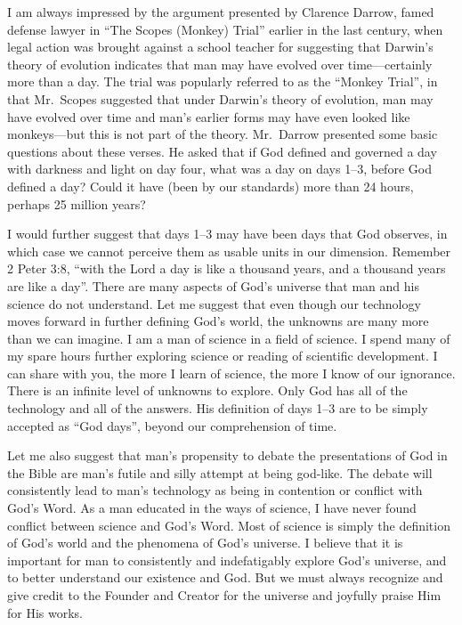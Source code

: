 \documentclass[12pt]{memoir}
\begin{document}
I am always impressed by the argument presented by Clarence Darrow,
famed defense lawyer in ``The Scopes (Monkey) Trial'' earlier in
the last century, when legal action was brought against a school teacher
for suggesting that Darwin's theory of evolution indicates that man
may have evolved over time---certainly more than a day. The trial
was popularly referred to as the ``Monkey Trial'', in that Mr.\ Scopes
suggested that under Darwin's theory of evolution, man may have evolved
over time and man's earlier forms may have even looked like monkeys---but
this is not part of the theory. Mr.\ Darrow presented some basic questions
about these verses. He asked that if God defined and governed a day with darkness and light on day four, what was a day on days 1--3, before God defined a day? Could it have (been by our standards) more
than 24 hours, perhaps 25 million years?

I would further suggest that days 1--3 may have been days that God observes, in which case we cannot perceive them as usable units in our dimension. Remember 2 Peter 3:8, ``with the Lord a day is like a thousand years, and a thousand years are like a day''. There are
many aspects of God's universe that man and his science do not understand.
Let me suggest that even though our technology moves forward in further
defining God's world, the unknowns are many more than we can imagine.
I am a man of science in a field of science. I spend many of my spare
hours further exploring science or reading of scientific development.
I can share with you, the more I learn of science, the more I know
of our ignorance. There is an infinite level of unknowns to explore.
Only God has all of the technology and all of the answers. His definition
of days 1--3 are to be simply accepted as ``God days'', beyond our comprehension
of time.

Let me also suggest that man's propensity to debate the presentations
of God in the Bible are man's futile and silly attempt at being god-like. The debate will consistently lead to man's technology
as being in contention or conflict with God's Word. As a man educated
in the ways of science, I have never found conflict between science
and God's Word. Most of science is simply the definition of God's
world and the phenomena of God's universe. I believe that it is important
for man to consistently and indefatigably explore God's universe,
and to better understand our existence and God. But we must always recognize and give credit to the Founder and Creator for the universe and joyfully praise Him for His works.
\end{document}
